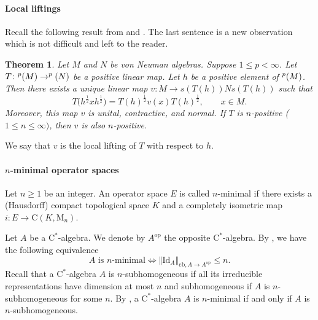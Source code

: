 \documentclass[leqno]{article} %
\let\L\relax
\newcommand{\L}{\mathrm{L}}
\newcommand{\M}{\mathrm{M}}
\renewcommand{\leq}{\ensuremath{\leqslant}}
\renewcommand{\geq}{\ensuremath{\geqslant}}
\newcommand{\norm}[1]{\left\Vert#1\right\Vert}
\newcommand{\co}{\colon}
\newcommand{\Id}{\mathrm{Id}} %
\newcommand{\op}{\mathrm{op}} %
\newcommand{\cb}{\mathrm{cb}} %
\newtheorem{thm}{Theorem}[section]
\numberwithin{equation}{section}
\begin{document}
\newpage

\paragraph{Local liftings} Recall the following result from \cite{Arh1} and \cite{ArR1}. The last sentence is a new observation which is not difficult and left to the reader.

\begin{thm}
\label{Th-relevement-cp} 
Let $M$ and $N$ be von Neuman algebras. Suppose $1 \leq p < \infty$. Let $T \co \L^p(M) \to \L^p(N)$ be a positive linear map. Let $h$ be a positive element of $\L^p(M)$. Then there exists a unique linear map $v \co M \to s(T(h))Ns(T(h))$ such that 
\begin{equation}
\label{equa-relevement}
T\big(h^{\frac{1}{2}}xh^{\frac{1}{2}}\big)
=T(h)^{\frac{1}{2}}v(x)T(h)^{\frac{1}{2}},\qquad x \in M.
\end{equation}
Moreover, this map $v$ is unital, contractive, and normal. If $T$ is $n$-positive ($1 \leq n \leq \infty)$, then $v$ is also $n$-positive. 
\end{thm}

We say that $v$ is the local lifting of $T$ with respect to $h$.

\vspace{0.2cm}



\paragraph{$n$-minimal operator spaces}

Let $n \geq 1$ be an integer. An operator space $E$ is called $n$-minimal if there exists a (Hausdorff) compact topological space $K$ and a completely isometric map $i \co E \to \mathrm{C}(K,\M_n)$. 

Let $A$ be a $\mathrm{C}^*$-algebra. We denote by $A^\op$ the opposite $\mathrm{C}^*$-algebra. By \cite[Theorem 2.2]{Roy1}, we have the following equivalence  %
\begin{equation}
\label{Equivalence-Roydor}
A \text{ is $n$-minimal}
\iff \norm{\Id_A}_{\cb, A \to A^\op} \leq n.
\end{equation}
Recall that a $\mathrm{C}^*$-algebra $A$ is $n$-subhomogeneous \cite[Definition 2.7.6]{BrO1} if all its irreducible representations have dimension at most $n$ and subhomogeneous if $A$ is $n$-subhomogeneous for some $n$. By \cite[Theorem 2.2]{Roy1}, a $\mathrm{C}^*$-algebra $A$ is $n$-minimal if and only if $A$ is $n$-subhomogeneous.
\end{document}
